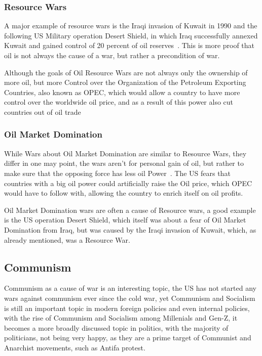 \documentclass[12pt,a4paper]{article}
\begin{document}
		\subsubsection{Resource Wars}
		A major example of resource wars is the Iraqi invasion of Kuwait in 1990 and the following US Military operation Desert Shield, in which Iraq successfully annexed Kuwait and gained control of 20 percent of oil reserves~\cite{history-iraq-kuwait}. This is more proof that oil is not always the cause of a war, but rather a precondition of war.
		
		Although the goals of Oil Resource Wars are not always only the ownership of more oil, but more Control over the Organization of the Petroleum Exporting Countries, also known as OPEC, which would allow a country to have more control over the worldwide oil price, and as a result of this power also cut countries out of oil trade
		\subsubsection{Oil Market Domination}
		While Wars about Oil Market Domination are similar to Resource Wars, they differ in one may point, the wars aren't for personal gain of oil, but rather to make sure that the opposing force has less oil Power~\cite{fueling-fire-jeff-d}. The US fears that countries with a big oil power could artificially raise the Oil price, which OPEC would have to follow with, allowing the country to enrich itself on oil profits.
		
		Oil Market Domination wars are often a cause of Resource wars, a good example is the US operation Desert Shield, which itself was about a fear of Oil Market Domination from Iraq, but was caused by the Iraqi invasion of Kuwait, which, as already mentioned, was a Resource War.
		\subsection{Communism}
		Communism as a cause of war is an interesting topic, the US has not started any wars against communism ever since the cold war, yet Communism and Socialism is still an important topic in modern foreign policies and even internal policies, with the rise of Communism and Socialism among Millenials and Gen-Z, it becomes a more broadly discussed topic in politics, with the majority of politicians, not being very happy, as they are a prime target of Communist and Anarchist movements, such as Antifa protest.
		
\end{document}
